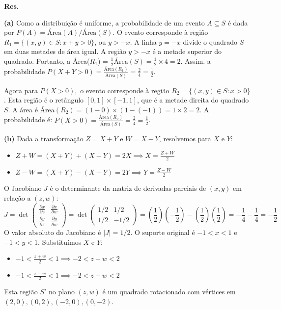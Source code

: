 {\small {\bf Res. }
	
	{\bf (a)} Como a distribuição é uniforme, a probabilidade de um evento $A \subseteq S$ é dada por $P(A) = \text{Área}(A) / \text{Área}(S)$. O evento corresponde à região $R_1 = \{ (x,y) \in S : x+y > 0 \}$, ou $y > -x$. A linha $y=-x$ divide o quadrado $S$ em duas metades de área igual. A região $y > -x$ é a metade superior do quadrado. Portanto, a Área($R_1$) = $\frac{1}{2} \text{Área}(S) = \frac{1}{2} \times 4 = 2$. Assim. a probabilidade $ P(X+Y>0) = \frac{\text{Área}(R_1)}{\text{Área}(S)} = \frac{2}{4} = \frac{1}{2}$.
	
	Agora para $P(X>0),$ o evento corresponde à região $R_2 = \{ (x,y) \in S : x > 0 \}$. Esta região é o retângulo $[0,1] \times [-1,1]$, que é a metade direita do quadrado $S$. A área é $\text{Área}(R_2) = (1-0) \times (1-(-1)) = 1 \times 2 = 2$.
	A probabilidade é: $ P(X>0) = \frac{\text{Área}(R_2)}{\text{Área}(S)} = \frac{2}{4} = \frac{1}{2}$.
	
	{\bf (b)}
	Dada a transformação $Z=X+Y$ e $W=X-Y$, resolvemos para $X$ e $Y$:
	\begin{itemize}
		\item $Z+W = (X+Y)+(X-Y) = 2X \implies X = \frac{Z+W}{2}$
		\item $Z-W = (X+Y)-(X-Y) = 2Y \implies Y = \frac{Z-W}{2}$
	\end{itemize}
	O Jacobiano $J$ é o determinante da matriz de derivadas parciais de $(x,y)$ em relação a $(z,w)$:
	$$ J = \det \begin{pmatrix} \frac{\partial x}{\partial z} & \frac{\partial x}{\partial w} \\ \frac{\partial y}{\partial z} & \frac{\partial y}{\partial w} \end{pmatrix} = \det \begin{pmatrix} 1/2 & 1/2 \\ 1/2 & -1/2 \end{pmatrix} = \left(\frac{1}{2}\right)\left(-\frac{1}{2}\right) - \left(\frac{1}{2}\right)\left(\frac{1}{2}\right) = -\frac{1}{4} - \frac{1}{4} = -\frac{1}{2} $$
	O valor absoluto do Jacobiano é $|J| = 1/2$. O suporte original é $-1<x<1$ e $-1<y<1$. Substituímos $X$ e $Y$:
	\begin{itemize}
		\item $-1 < \frac{z+w}{2} < 1 \implies -2 < z+w < 2$
		\item $-1 < \frac{z-w}{2} < 1 \implies -2 < z-w < 2$
	\end{itemize}
	Esta região $S'$ no plano $(z,w)$ é um quadrado rotacionado com vértices em $(2,0), (0,2), (-2,0), (0,-2)$.
	
}
